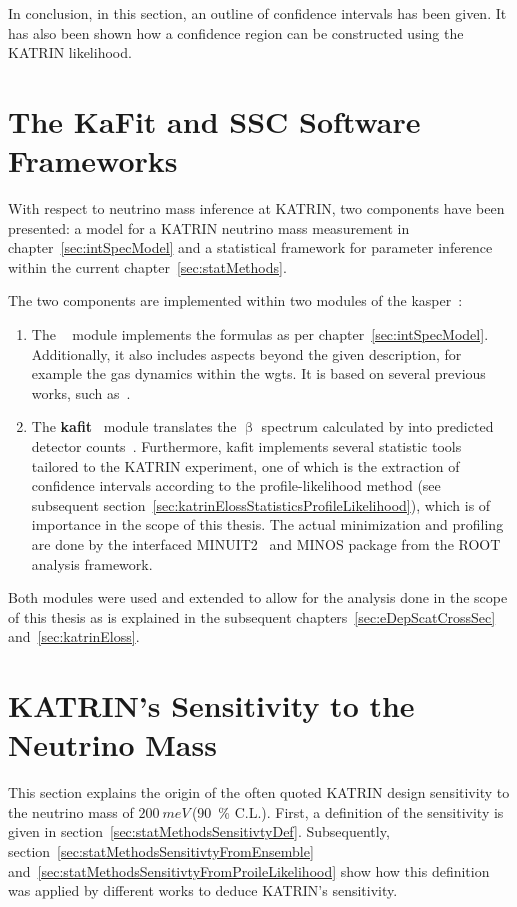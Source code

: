 In conclusion, in this section, an outline of confidence intervals has been given. It has also been shown how a confidence region can be constructed using the KATRIN likelihood. 

\section{The KaFit and SSC Software Frameworks}
\label{sec:statMethodsKaFitSSC}
With respect to neutrino mass inference at KATRIN, two components have been presented: a model for a KATRIN neutrino mass measurement in chapter~\ref{sec:intSpecModel} and a statistical framework for parameter inference within the current chapter~\ref{sec:statMethods}.

The two components are implemented within two modules of the \gls{kasper}~\cite{Kasper}:\mynobreakpar
\begin{enumerate}
	\item The \textbf{}~\cite{SSC} module implements the formulas as per chapter~\ref{sec:intSpecModel}. Additionally, it also includes aspects beyond the given description, for example the gas dynamics within the \gls{wgts}. It is based on several previous works, such as~\cite{Hoetzel2012, Groh2015, Kleesiek2019, Kaefer2012, Heizmann2018, Kuckert2018}.
	\item The \textbf{\gls{kafit}}~\cite{KaFit} module translates the $\upbeta$ spectrum calculated by  into predicted detector counts~\cite{Kleesiek2014}. Furthermore, \gls{kafit} implements several statistic tools tailored to the KATRIN experiment, one of which is the extraction of confidence intervals according to the profile-likelihood method (see subsequent section~\ref{sec:katrinElossStatisticsProfileLikelihood}), which is of importance in the scope of this thesis. The actual minimization and profiling are done by the interfaced MINUIT2~\cite{James1998} and MINOS package from the ROOT~\cite{ANTCHEVA2009} analysis framework.
\end{enumerate}

Both modules were used and extended to allow for the analysis done in the scope of this thesis as is explained in the subsequent chapters~\ref{sec:eDepScatCrossSec} and~\ref{sec:katrinEloss}.

\section{KATRIN's Sensitivity to the Neutrino Mass}
\label{sec:statMethodsKatrinSensitivity}
This section explains the origin of the often quoted KATRIN design sensitivity to the neutrino mass of $\SI{200}{meV}$\,(\SI{90}{\percent} C.L.). First, a definition of the sensitivity is given in section~\ref{sec:statMethodsSensitivtyDef}. Subsequently, section~\ref{sec:statMethodsSensitivtyFromEnsemble} and~\ref{sec:statMethodsSensitivtyFromProileLikelihood} show how this definition was applied by different works to deduce KATRIN's sensitivity.

